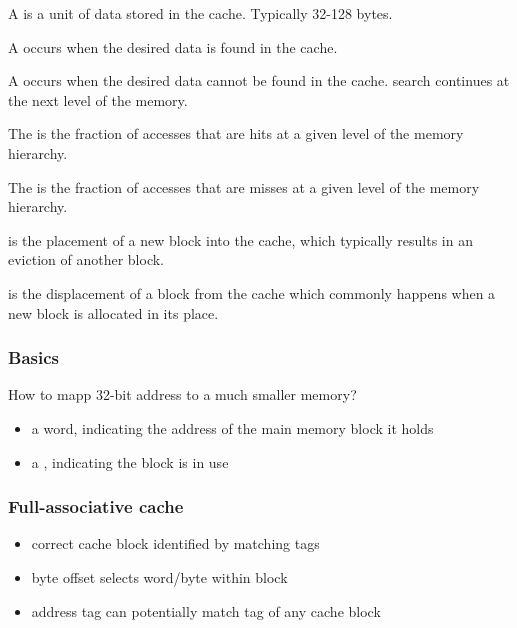 \documentclass{article}
\begin{document}
\begin{definition}
	A  is a unit of data stored in the cache. Typically 32-128 bytes.
\end{definition}
\begin{definition}
	A  occurs when the desired data is found in the cache.
\end{definition}
\begin{definition}
	A  occurs when the desired data cannot be found in the cache.
	\Rightarrow search continues at the next level of the memory.
\end{definition}
\begin{definition}
	The  is the fraction of accesses that are hits at a given level of the memory hierarchy.
\end{definition}
\begin{definition}
	The  is the fraction of accesses that are misses at a given level of the memory hierarchy.
\end{definition}
\begin{definition}
	 is the placement of a new block into the cache, which typically results in an eviction
	of another block.
\end{definition}
\begin{definition}
	 is the displacement of a block from the cache which commonly happens when a new block is
	allocated in its place.
\end{definition}

\subsubsection{Basics}

How to mapp 32-bit address to a much smaller memory?
\begin{itemize}
	\item a  word, indicating the address of the main memory block it holds
	\item a , indicating the block is in use
\end{itemize}

\subsubsection{Full-associative cache}

\begin{itemize}
	\item correct cache block identified by matching tags
	\item byte offset selects word/byte within block
	\item address tag can potentially match tag of any cache block
\end{itemize}
\end{document}
